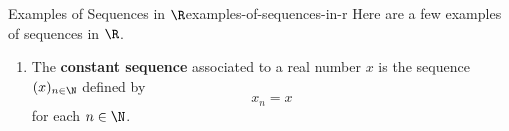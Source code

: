 \begin{example}{Examples of Sequences in $\R$}{examples-of-sequences-in-r}%
    Here are a few examples of sequences in $\R$.
    \begin{enumerate}
        \item\label{examples-of-sequences-in-r-constant-sequences}The \textbf{constant sequence} associated to a real number $x$ is the sequence $(x)_{n\in\N}$ defined by
            \[
                x_{n}%
                =%
                x%
            \]%
            for each $n\in\N$.
    \end{enumerate}
\end{example}
